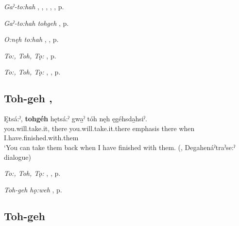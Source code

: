 \begin{CayugaRelated}
\item \textit{Gaˀ-to:hah} , , , , , p. \pageref{p:[gaˀ-to:hah]}\\
\item \textit{Gaˀ-to:hah tohgeh} , p. \pageref{p:[gaˀ-to:hah tohgeh]}\\
\item \textit{O:nęh to:hah} , , p. \pageref{p:o:nęh to:hah]}\\
\item \textit{To:, Toh, Tǫ:} , p. \pageref{p:[to:] ‘that one’}\\
\item \textit{To:, Toh, Tǫ:} , , p. \pageref{p:[to:] ‘there’, ‘that place’}
\end{CayugaRelated}

\subsection*{\textbf{Toh-geh} , } \label{p:[toh-geh] ‘there, ‘then’}

\ea
\label{ex:tpart75}
\gll Ętsá:ˀ, \textbf{tohgéh} hętsá:ˀ gwa̱ˀ tóh nęh ęgéhsda̱hsiˀ.\\
you.will.take.it, there you.will.take.it.there emphasis there when I.have.finished.with.them\\
\glt ‘You can take them back when I have finished with them. (\cite[368]{mithun_watewayestanih_1984}, Degahenáˀtraˀse:ˀ dialogue)
\z

\begin{CayugaRelated}
\item \textit{To:, Toh, Tǫ:} , , p. \pageref{p:[to:] ‘there’, ‘that place’}\\
\item \textit{Toh-geh hǫ:weh} , p. \pageref{p:[toh-geh hǫ:weh]}
\end{CayugaRelated}

\subsection*{\textbf{Toh-geh} } \label{p:[toh-geh] ‘and then’}

